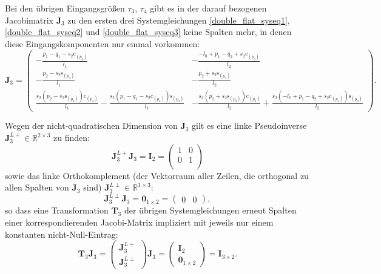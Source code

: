 Bei den übrigen Eingangsgrößen $\tau_3$, $\tau_4$ gibt es in der darauf bezogenen Jacobimatrix $\mathbf{J}_3$ zu den ersten drei Systemgleichungen  \eqref{double_flat_syseq1}, \eqref{double_flat_syseq2} und \eqref{double_flat_syseq3} keine Spalten mehr, in denen diese Eingangskomponenten nur einmal vorkommen:
\begin{equation*}
	\mathbf{J}_3 =
	\left(\begin{smallmatrix}
	- \frac{p_{1} - q_{1} - s_{2} \mathrm{c}_{\left(p_{3} \right)}}{l_{1}} & - \frac{- l_{0} + p_{1} - q_{2} + s_{2} \mathrm{c}_{\left(p_{3} \right)}}{l_{2}}\\
	- \frac{p_{2} - s_{2} \mathrm{s}_{\left(p_{3} \right)}}{l_{1}} & - \frac{p_{2} + s_{2} \mathrm{s}_{\left(p_{3} \right)}}{l_{2}}\\
	\frac{s_{2} \left(p_{2} - s_{2} \mathrm{s}_{\left(p_{3} \right)}\right) \mathrm{c}_{\left(p_{3} \right)}}{l_{1}} - \frac{s_{2} \left(p_{1} - q_{1} - s_{2} \mathrm{c}_{\left(p_{3} \right)}\right) \mathrm{s}_{\left(p_{3} \right)}}{l_{1}} & - \frac{s_{2} \left(p_{2} + s_{2} \mathrm{s}_{\left(p_{3} \right)}\right) \mathrm{c}_{\left(p_{3} \right)}}{l_{2}} + \frac{s_{2} \left(- l_{0} + p_{1} - q_{2} + s_{2} \mathrm{c}_{\left(p_{3} \right)}\right) \mathrm{s}_{\left(p_{3} \right)}}{l_{2}}
	\end{smallmatrix}\right).
\end{equation*}

Wegen der nicht-quadratischen Dimension von $\mathbf{J}_3$ gilt es eine linke Pseudoinverse $\mathbf{J}_3^{L+} \in \mathbb{R}^{2 \times 3}$ zu finden:
\begin{equation}
	\mathbf{J}_3^{L+} \mathbf{J}_3 = \mathbf{I}_{2} = 
	\left(\begin{matrix}
	1 & 0\\
	0 & 1\\
	\end{matrix}\right)	
\end{equation}
sowie das linke Orthokomplement (der Vektorraum aller Zeilen, die orthogonal zu allen Spalten von $\mathbf{J}_3$ sind) $\mathbf{J}_3^{L\perp} \in \mathbb{R}^{1 \times 3}$:
\begin{equation}
	\mathbf{J}_3^{L\perp} \mathbf{J}_3 = \mathbf{0}_{1 \times 2} = 
	\left(\begin{matrix}
	0 & 0
	\end{matrix}\right),
\end{equation}
so dass eine Transformation $\mathbf{T}_3$ der übrigen Systemgleichungen erneut Spalten einer korrespondierenden Jacobi-Matrix impliziert mit jeweils nur einem konstanten nicht-Null-Eintrag:
\begin{equation}
	\mathbf{T}_3 \mathbf{J}_3 =
	\left(\begin{matrix}
		\mathbf{J}_3^{L+} \\
		\mathbf{J}_3^{L \perp}
	\end{matrix}\right)
	\mathbf{J}_3 =
	\left(\begin{matrix}
		\mathbf{I}_{2} \\
		\mathbf{0}_{1 \times 2}
	\end{matrix}\right)
	=
	\mathbf{I}_{3 \times 2}. 
\end{equation}

